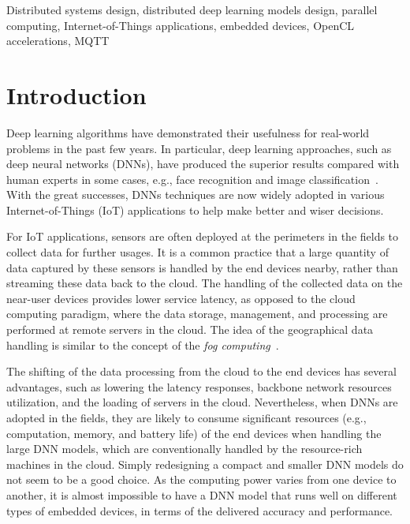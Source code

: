 \documentclass[conference]{IEEEtran}
\begin{document}
\begin{IEEEkeywords}
Distributed systems design, distributed deep learning models design, parallel computing, Internet-of-Things applications, embedded devices, OpenCL accelerations, MQTT
\end{IEEEkeywords}

\section{Introduction}

Deep learning algorithms have demonstrated their usefulness for real-world problems in the past few years. In particular, deep learning approaches, such as deep neural networks (DNNs), have produced the superior results compared with human experts in some cases, e.g., face recognition and image classification~\cite{Ciregan2012}. With the great successes, DNNs techniques are now widely adopted in various Internet-of-Things (IoT) applications to help make better and wiser decisions.

For IoT applications, sensors are often deployed at the perimeters in the fields to collect data for further usages. It is a common practice that a large quantity of data captured by these sensors is handled by the end devices nearby, rather than streaming these data back to the cloud. The handling of the collected data on the near-user devices provides lower service latency, as opposed to the cloud computing paradigm, where the data storage, management, and processing are performed at remote servers in the cloud. The idea of the geographical data handling is similar to the concept of the \emph{fog computing}~\cite{bonomi2014fog}.

The shifting of the data processing from the cloud to the end devices has several advantages, such as lowering the latency responses, backbone network resources utilization, and the loading of servers in the cloud. Nevertheless, when DNNs are adopted in the fields, they are likely to consume significant resources (e.g., computation, memory, and battery life) of the end devices when handling the large DNN models, which are conventionally handled by the resource-rich machines in the cloud. Simply redesigning a compact and smaller DNN models do not seem to be a good choice. As the computing power varies from one device to another, it is almost impossible to have a DNN model that runs well on different types of embedded devices, in terms of the delivered accuracy and performance.
\end{document}
